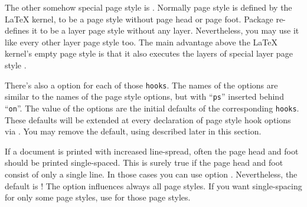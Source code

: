 The other somehow special page style is . Normally page style
 is defined by the \LaTeX{} kernel, to be a page style
without page head or page foot. Package  re-defines it to be
a layer page style without any layer. Nevertheless, you may use it like every
other layer page style too. The main advantage above the \LaTeX{} kernel's
empty page style is that it also executes the layers of special layer page
style .%
\EndIndexGroup


\begin{Declaration}
\end{Declaration}
There's also a \KOMAScript{} option for each of those \texttt{hooks}. The
names of the \KOMAScript{} options are similar to the names of the page style
options, but with ``\texttt{ps}'' inserted behind ``\texttt{on}''. The value
of the \KOMAScript{} options are the initial defaults of the corresponding
\texttt{hooks}. These defaults will be extended at every declaration of page
style hook options via . You may remove the default, using
 described later in this section.%
\EndIndexGroup


\begin{Declaration}
\end{Declaration}
If a document is printed with increased line-spread, often the page head and
foot should be printed single-spaced. This is surely true if the page head and
foot consist of only a single line. In those cases you can use \KOMAScript{}
option . Nevertheless, the default is
! The option influences always all page
styles. If you want single-spacing for only some page styles, use
 for
those page styles.%
\EndIndexGroup


